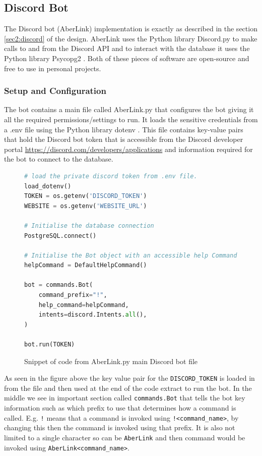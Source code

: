 \subsection{Discord Bot}
The Discord bot (AberLink) implementation is exactly as described in the section \ref{sec2:discord} of the design. AberLink uses the Python library Discord.py \cite{discord.py} to make calls to and from the Discord API and to interact with the database it uses the Python library Psycopg2 \cite{psycopg2}. Both of these pieces of software are open-source and free to use in personal projects. 

\subsubsection{Setup and Configuration}
The bot contains a main file called AberLink.py that configures the bot giving it all the required permissions/settings to run. It loads the sensitive credentials from a .env file using the Python library dotenv \cite{dotenv}. This file contains key-value pairs that hold the Discord bot token that is accessible from the Discord developer portal \href{https://discord.com/developers/applications}{https://discord.com/developers/applications} and information required for the bot to connect to the database.

\begin{figure}[H]
	\begin{lstlisting}[language=Python]
# load the private discord token from .env file.
load_dotenv()
TOKEN = os.getenv('DISCORD_TOKEN')
WEBSITE = os.getenv('WEBSITE_URL')

# Initialise the database connection
PostgreSQL.connect()

# Initialise the Bot object with an accessible help Command object
helpCommand = DefaultHelpCommand()

bot = commands.Bot(
    command_prefix="!",
    help_command=helpCommand,
    intents=discord.Intents.all(),
)

bot.run(TOKEN)
\end{lstlisting}
\caption{Snippet of code from AberLink.py main Discord bot file}
\label{fig:discord-main-file}
\end{figure}

As seen in the figure above the key value pair for the \verb|DISCORD_TOKEN| is loaded in from the file and then used at the end of the code extract to run the bot. In the middle we see in important section called \verb|commands.Bot| that tells the bot key information such as which prefix to use that determines how a command is called. E.g. \verb|!| means that a command is invoked using \verb|!<command_name>|, by changing this then the command is invoked using that prefix. It is also not limited to a single character so can be \verb|AberLink| and then command would be invoked using \verb|AberLink<command_name>|.

